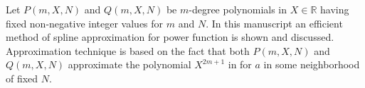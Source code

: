 ﻿Let $P(m, X, N)$ and $Q(m, X, N)$ be $m$-degree polynomials in $X\in\mathbb{R}$
having fixed non-negative integer values for $m$ and $N$.
In this manuscript an efficient method of spline approximation for power function is shown and discussed.
Approximation technique is based on the fact that both $P(m, X, N)$ and $Q(m, X, N)$
approximate the polynomial $X^{2m+1}$ in for $a$ in some neighborhood of fixed $N$.
